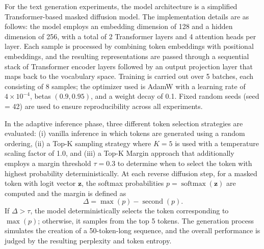 \documentclass{article}
\begin{document}
For the text generation experiments, the model architecture is a simplified Transformer-based masked diffusion model. The implementation details are as follows: the model employs an embedding dimension of 128 and a hidden dimension of 256, with a total of 2 Transformer layers and 4 attention heads per layer. Each sample is processed by combining token embeddings with positional embeddings, and the resulting representations are passed through a sequential stack of Transformer encoder layers followed by an output projection layer that maps back to the vocabulary space. Training is carried out over 5 batches, each consisting of 8 samples; the optimizer used is AdamW with a learning rate of \(4 \times 10^{-4}\), betas \((0.9, 0.95)\), and a weight decay of 0.1. Fixed random seeds (seed = 42) are used to ensure reproducibility across all experiments.

In the adaptive inference phase, three different token selection strategies are evaluated: (i) vanilla inference in which tokens are generated using a random ordering, (ii) a Top-K sampling strategy where \(K = 5\) is used with a temperature scaling factor of 1.0, and (iii) a Top-K Margin approach that additionally employs a margin threshold \(\tau = 0.3\) to determine when to select the token with highest probability deterministically. At each reverse diffusion step, for a masked token with logit vector \(\mathbf{z}\), the softmax probabilities \(p = \operatorname{softmax}(\mathbf{z})\) are computed and the margin is defined as 
\[
\Delta = \max(p) - \operatorname{second}(p).
\]
If \(\Delta > \tau\), the model deterministically selects the token corresponding to \(\max(p)\); otherwise, it samples from the top 5 tokens. The generation process simulates the creation of a 50-token-long sequence, and the overall performance is judged by the resulting perplexity and token entropy.
\end{document}
